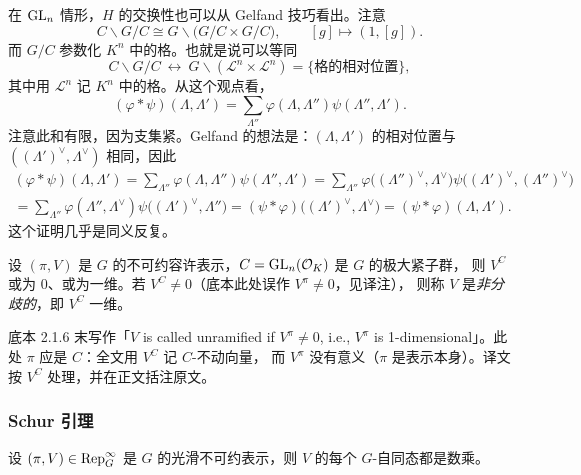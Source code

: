 \begin{remark}
在 $\mathrm{GL}_n$ 情形，$H$ 的交换性也可以从 Gelfand 技巧看出。注意
\[
C\backslash G/C\cong G\backslash\bigl(G/C\times G/C\bigr),
\qquad [g]\longmapsto(1,[g]).
\]
而 $G/C$ 参数化 $K^{n}$ 中的格。也就是说可以等同
\[
C\backslash G/C\ \longleftrightarrow\ G\backslash(\mathcal{L}^{n}\times\mathcal{L}^{n})
=\{\text{格的相对位置}\},
\]
其中用 $\mathcal{L}^{n}$ 记 $K^{n}$ 中的格。从这个观点看，
\[
(\varphi*\psi)(\Lambda,\Lambda')=\sum_{\Lambda''}\varphi(\Lambda,\Lambda'')\psi(\Lambda'',\Lambda').
\]
注意此和有限，因为支集紧。Gelfand 的想法是：$(\Lambda,\Lambda')$ 的相对位置与
$((\Lambda')^{\vee},\Lambda^{\vee})$ 相同，因此
\begin{multline*}
(\varphi*\psi)(\Lambda,\Lambda')
=\sum_{\Lambda''}\varphi(\Lambda,\Lambda'')\psi(\Lambda'',\Lambda')
=\sum_{\Lambda''}\varphi\bigl((\Lambda'')^{\vee},\Lambda^{\vee}\bigr)
\psi\bigl((\Lambda')^{\vee},(\Lambda'')^{\vee}\bigr)\\
=\sum_{\Lambda''}\varphi(\Lambda'',\Lambda^{\vee})\psi\bigl((\Lambda')^{\vee},\Lambda''\bigr)
=(\psi*\varphi)\bigl((\Lambda')^{\vee},\Lambda^{\vee}\bigr)=(\psi*\varphi)(\Lambda,\Lambda').
\end{multline*}
这个证明几乎是同义反复。
\end{remark}

\begin{corollarydefinition}
设 $(\pi,V)$ 是 $G$ 的不可约容许表示，$C=\mathrm{GL}_n(\mathcal{O}_K)$ 是 $G$ 的极大紧子群，
则 $V^{C}$ 或为 $0$、或为一维。若 $V^{C}\neq 0$（底本此处误作 $V^{\pi}\neq 0$，见译注），
则称 $V$ 是\emph{非分歧的}，即 $V^{C}$ 一维。
\end{corollarydefinition}

\begin{yizhu}[底本的笔误：$V^{\pi}$ 应为 $V^{C}$]
底本 2.1.6 末写作「$V$ is called unramified if $V^{\pi}\neq 0$, i.e., $V^{\pi}$ is
1-dimensional」。此处 $\pi$ 应是 $C$：全文用 $V^{C}$ 记 $C$-不动向量，
而 $V^{\pi}$ 没有意义（$\pi$ 是表示本身）。译文按 $V^{C}$ 处理，并在正文括注原文。
\end{yizhu}

\subsubsection{Schur 引理}

\begin{lemma}
设 $(\pi,V)\in\mathrm{Rep}^{\infty}_G$ 是 $G$ 的光滑不可约表示，则 $V$ 的每个 $G$-自同态都是数乘。
\end{lemma}

